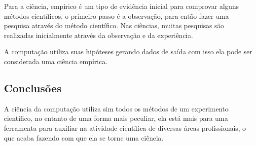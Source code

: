 Para a ciência, empírico é um tipo de evidência inicial para comprovar alguns métodos científicos, o primeiro passo é a observação, para então fazer uma pesquisa através do método científico. Nas ciências, muitas pesquisas são realizadas inicialmente através da observação e da experiência.

A computação utiliza suas \gls{hipótese}s gerando dados de saída com isso ela pode ser considerada uma ciência empírica.

\subsection{Conclusões}

A ciência da computação utiliza sim todos os métodos de um experimento científico, no entanto de uma forma mais peculiar, ela está mais para uma ferramenta para auxiliar na atividade científica de diversas áreas profissionais, o que acaba fazendo com que ela se torne uma ciência. 
